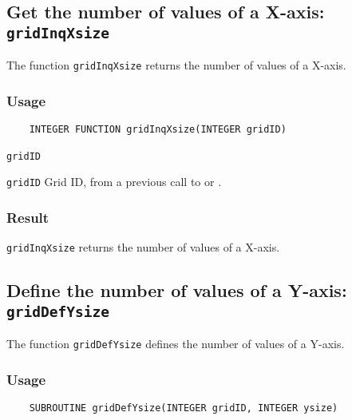\subsection{Get the number of values of a X-axis: \texttt{gridInqXsize}}
\label{gridInqXsize}

The function {\texttt{gridInqXsize}} returns the number of values of a X-axis.

\subsubsection*{Usage}

\begin{verbatim}
    INTEGER FUNCTION gridInqXsize(INTEGER gridID)
\end{verbatim}

\hspace*{4mm}\begin{minipage}[]{15cm}
\begin{deflist}{\texttt{gridID}\ }
\item[\texttt{gridID}]
Grid ID, from a previous call to {} or {}.

\end{deflist}
\end{minipage}

\subsubsection*{Result}

{\texttt{gridInqXsize}} returns the number of values of a X-axis.



\subsection{Define the number of values of a Y-axis: \texttt{gridDefYsize}}
\label{gridDefYsize}

The function {\texttt{gridDefYsize}} defines the number of values of a Y-axis.

\subsubsection*{Usage}

\begin{verbatim}
    SUBROUTINE gridDefYsize(INTEGER gridID, INTEGER ysize)
\end{verbatim}

